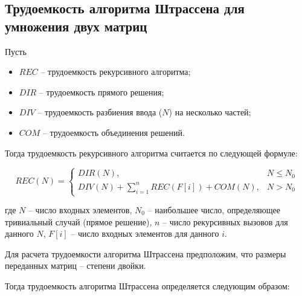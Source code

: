 \clearpage

\subsection{Трудоемкость алгоритма Штрассена для умножения двух матриц}

Пусть 
\begin{itemize}[label=---]
	\item $REC$ -- трудоемкость рекурсивного алгоритма;
	\item $DIR$ -- трудоемкость прямого решения;
	\item $DIV$ -- трудоемкость разбиения ввода ($N$) на несколько частей;
	\item $COM$ -- трудоемкость объединения решений.
\end{itemize}

Тогда трудоемкость рекурсивного алгоритма считается по следующей формуле:

\begin{equation}
	\label{eq:rec}
	REC(N) =
	\begin{cases}
		DIR(N), & N \leq N_0\\
		DIV(N) + \displaystyle\sum_{i=1}^{n} REC(F[i]) + COM(N), & N > N_0
	\end{cases}
\end{equation}

где $N$ -- число входных элементов, $N_0$ -- наибольшее число, определяющее тривиальный случай (прямое решение), $n$ -- число рекурсивных вызовов для данного $N$, $F[i]$ -- число входных элементов для данного $i$.

Для расчета трудоемкости алгоритма Штрассена предположим, что размеры переданных матриц -- степени двойки.

Тогда трудоемкость алгоритма Штрассена определяется следующим образом:

